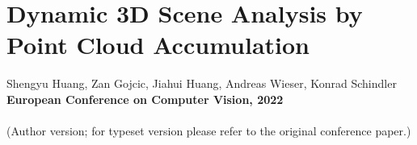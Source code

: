 \chapter[Dynamic 3D Scene Analysis by Point Cloud Accumulation]{Dynamic 3D Scene Analysis by Point Cloud Accumulation}
\label{chap:eccv22}

Shengyu Huang, Zan Gojcic, Jiahui Huang, Andreas Wieser, Konrad Schindler\\
\textbf{European Conference on Computer Vision, 2022}\\
\\
(Author version; for typeset version please refer to the original conference paper.)\\

\providecommand{\subdir}{.}
\graphicspath{{\subdir/}}





\newpage









\newpage
